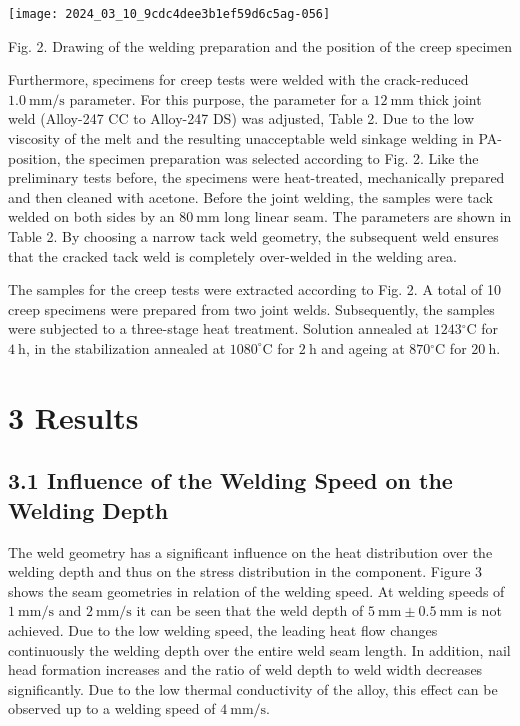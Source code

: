 \documentclass[10pt]{article}
\begin{document}
\begin{center}
\texttt{[image: 2024\_03\_10\_9cdc4dee3b1ef59d6c5ag-056]}
\end{center}

Fig. 2. Drawing of the welding preparation and the position of the creep specimen

Furthermore, specimens for creep tests were welded with the crack-reduced $1.0 \mathrm{~mm} / \mathrm{s}$ parameter. For this purpose, the parameter for a $12 \mathrm{~mm}$ thick joint weld (Alloy-247 CC to Alloy-247 DS) was adjusted, Table 2. Due to the low viscosity of the melt and the resulting unacceptable weld sinkage welding in PA-position, the specimen preparation was selected according to Fig. 2. Like the preliminary tests before, the specimens were heat-treated, mechanically prepared and then cleaned with acetone. Before the joint welding, the samples were tack welded on both sides by an $80 \mathrm{~mm}$ long linear seam. The parameters are shown in Table 2. By choosing a narrow tack weld geometry, the subsequent weld ensures that the cracked tack weld is completely over-welded in the welding area.

The samples for the creep tests were extracted according to Fig. 2. A total of 10 creep specimens were prepared from two joint welds. Subsequently, the samples were subjected to a three-stage heat treatment. Solution annealed at $1243{ }^{\circ} \mathrm{C}$ for $4 \mathrm{~h}$, in the stabilization annealed at $1080^{\circ} \mathrm{C}$ for $2 \mathrm{~h}$ and ageing at $870{ }^{\circ} \mathrm{C}$ for $20 \mathrm{~h}$.

\section*{3 Results}
\subsection*{3.1 Influence of the Welding Speed on the Welding Depth}
The weld geometry has a significant influence on the heat distribution over the welding depth and thus on the stress distribution in the component. Figure 3 shows the seam geometries in relation of the welding speed. At welding speeds of $1 \mathrm{~mm} / \mathrm{s}$ and $2 \mathrm{~mm} / \mathrm{s}$ it can be seen that the weld depth of $5 \mathrm{~mm} \pm 0.5 \mathrm{~mm}$ is not achieved. Due to the low welding speed, the leading heat flow changes continuously the welding depth over the entire weld seam length. In addition, nail head formation increases and the ratio of weld depth to weld width decreases significantly. Due to the low thermal conductivity of the alloy, this effect can be observed up to a welding speed of $4 \mathrm{~mm} / \mathrm{s}$.
\end{document}
